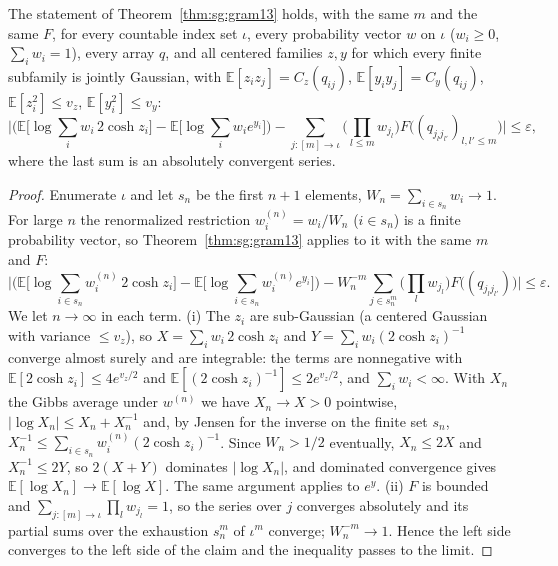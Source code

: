 \begin{theorem}\label{thm:sg:gram13-countable}
  \leanok
The statement of Theorem~\ref{thm:sg:gram13} holds, with the same $m$ and the same $F$, for every countable index set $\iota$, every probability vector $w$ on $\iota$ ($w_i\ge0$, $\sum_iw_i=1$), every array $q$, and all centered families $z,y$ for which every finite subfamily is jointly Gaussian, with $\mathbb E[z_iz_j]=C_z(q_{ij})$, $\mathbb E[y_iy_j]=C_y(q_{ij})$, $\mathbb E[z_i^2]\le v_z$, $\mathbb E[y_i^2]\le v_y$:
\[\Big|\Big(\mathbb E\big[\log\sum_iw_i\,2\cosh z_i\big]-\mathbb E\big[\log\sum_iw_ie^{y_i}\big]\Big)-\sum_{j:[m]\to\iota}\Big(\prod_{l\le m}w_{j_l}\Big)F\big((q_{j_lj_{l'}})_{l,l'\le m}\big)\Big|\le\varepsilon,\]
where the last sum is an absolutely convergent series.
\end{theorem}

\begin{proof}
  \leanok
Enumerate $\iota$ and let $s_n$ be the first $n+1$ elements, $W_n=\sum_{i\in s_n}w_i\to1$. For large $n$ the renormalized restriction $w^{(n)}_i=w_i/W_n$ ($i\in s_n$) is a finite probability vector, so Theorem~\ref{thm:sg:gram13} applies to it with the same $m$ and $F$:
\[\Big|\Big(\mathbb E\big[\log\sum_{i\in s_n}w^{(n)}_i\,2\cosh z_i\big]-\mathbb E\big[\log\sum_{i\in s_n}w^{(n)}_ie^{y_i}\big]\Big)-W_n^{-m}\sum_{j\in s_n^m}\Big(\prod_lw_{j_l}\Big)F\big((q_{j_lj_{l'}})\big)\Big|\le\varepsilon.\]
We let $n\to\infty$ in each term. (i) The $z_i$ are sub-Gaussian (a centered Gaussian with variance $\le v_z$), so $X=\sum_iw_i\,2\cosh z_i$ and $Y=\sum_iw_i(2\cosh z_i)^{-1}$ converge almost surely and are integrable: the terms are nonnegative with $\mathbb E[2\cosh z_i]\le4e^{v_z/2}$ and $\mathbb E[(2\cosh z_i)^{-1}]\le2e^{v_z/2}$, and $\sum_iw_i<\infty$. With $X_n$ the Gibbs average under $w^{(n)}$ we have $X_n\to X>0$ pointwise, $|\log X_n|\le X_n+X_n^{-1}$ and, by Jensen for the inverse on the finite set $s_n$, $X_n^{-1}\le\sum_{i\in s_n}w^{(n)}_i(2\cosh z_i)^{-1}$. Since $W_n>1/2$ eventually, $X_n\le2X$ and $X_n^{-1}\le2Y$, so $2(X+Y)$ dominates $|\log X_n|$, and dominated convergence gives $\mathbb E[\log X_n]\to\mathbb E[\log X]$. The same argument applies to $e^{y}$. (ii) $F$ is bounded and $\sum_{j:[m]\to\iota}\prod_lw_{j_l}=1$, so the series over $j$ converges absolutely and its partial sums over the exhaustion $s_n^m$ of $\iota^m$ converge; $W_n^{-m}\to1$. Hence the left side converges to the left side of the claim and the inequality passes to the limit.
\end{proof}

